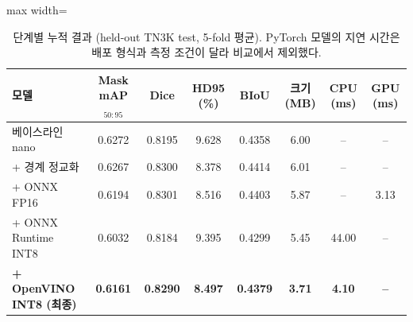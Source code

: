 \begin{table}[htbp]
\centering
\footnotesize
\caption[단계별 누적 결과 (held-out TN3K test, 5-fold 평균).]{단계별 누적 결과 (held-out TN3K test, 5-fold 평균). PyTorch 모델의 지연 시간은 배포 형식과 측정 조건이 달라 비교에서 제외했다.}
\label{tab:final}
\begin{adjustbox}{max width=\linewidth}
\begin{tabular}{lccccccc}
\toprule
모델 & Mask mAP$_{50:95}$ & Dice & HD95 (\%) & BIoU & 크기 (MB) & CPU (ms) & GPU (ms) \\
\midrule
베이스라인 nano & 0.6272 & 0.8195 & 9.628 & 0.4358 & 6.00 & -- & -- \\
+ 경계 정교화 & 0.6267 & 0.8300 & 8.378 & 0.4414 & 6.01 & -- & -- \\
+ ONNX FP16 & 0.6194 & 0.8301 & 8.516 & 0.4403 & 5.87 & -- & 3.13 \\
+ ONNX Runtime INT8 & 0.6032 & 0.8184 & 9.395 & 0.4299 & 5.45 & 44.00 & -- \\
\textbf{+ OpenVINO INT8 (최종)} & \textbf{0.6161} & \textbf{0.8290} & \textbf{8.497} & \textbf{0.4379} & \textbf{3.71} & \textbf{4.10} & \textbf{--} \\
\bottomrule
\end{tabular}
\end{adjustbox}
\end{table}
